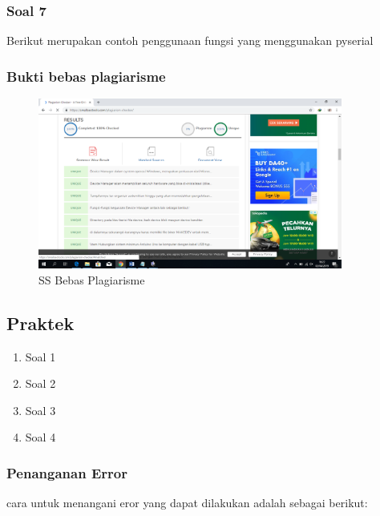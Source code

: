\subsubsection{Soal 7}
Berikut merupakan contoh penggunaan fungsi yang menggunakan pyserial


\subsubsection{Bukti bebas plagiarisme}
\begin{figure}[H]
\centering
\includegraphics[width=10cm]{figures/5/1174009/plagi.png}
\caption{SS Bebas Plagiarisme}
\label{dwiyul}
\end{figure}

\subsection{Praktek}
\begin{enumerate}
\item Soal 1


\item Soal 2


\item Soal 3


\item Soal 4


\end{enumerate}

\subsubsection{Penanganan Error}
cara untuk menangani eror yang dapat dilakukan adalah sebagai berikut:
